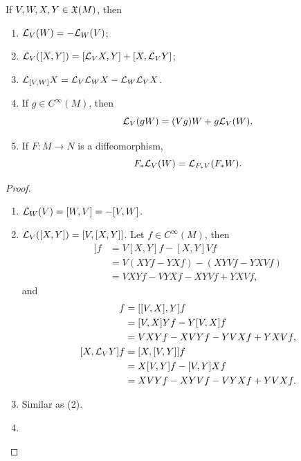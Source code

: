 \begin{corollary}\label{9.39}
    If $V,W,X,Y \in \frak{X}(M)$, then 
    \begin{enumerate}
    \item $\mathcal{L}_V(W) = -\mathcal{L}_W(V)$;
    \item $\mathcal{L}_V([X,Y]) = [\mathcal{L}_V X,Y] + [X,\mathcal{L}_V Y]$;
    \item $\mathcal{L}_{[V,W]}X = \mathcal{L}_V \mathcal{L}_W X - \mathcal{L}_W \mathcal{L}_V X$.
    \item If $g \in C^\infty(M)$, then 
    $$\mathcal{L}_V(gW) = (Vg)W + g\mathcal{L}_V(W).$$
    \item If $F:M \to N$ is a diffeomorphism, 
    $$F_*\mathcal{L}_V(W) = \mathcal{L}_{F_* V}(F_* W). $$
    \end{enumerate}
\end{corollary}
\begin{proof}
\begin{enumerate}
    \item $\mathcal{L}_W(V) = [W,V] = -[V,W]$.
    \item $\mathcal{L}_V([X,Y]) = [V,[X,Y]]$. Let $f \in C^\infty(M)$, then 
    \begin{align*}
    [V,[X,Y]]f &= V[X,Y]f - [X,Y]Vf \\
    &= V(XYf - YXf) - (XYVf-YXVf) \\
    &= VXYf - VYXf - XYVf + YXVf,
    \end{align*} and 
    \begin{align*}
    [\calL_V X,Y]f &= [[V,X],Y]f \\
    &= [V,X]Yf - Y[V,X]f \\
    &= VXYf - XVYf - YVXf + YXVf, \\
    [X,\calL_V Y]f &= [X,[V,Y]]f \\
    &= X[V,Y]f - [V,Y]Xf \\
    &= XVYf - XYVf - VYXf + YVXf.
    \end{align*}
    \item Similar as (2). 
    \item 
\end{enumerate}

\end{proof}
